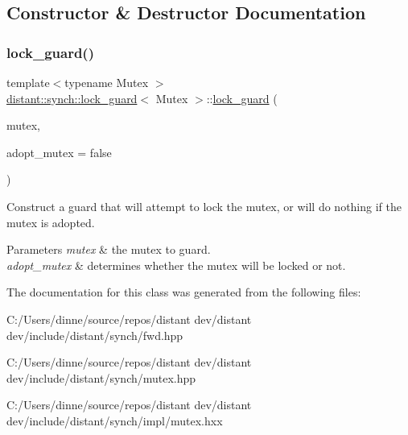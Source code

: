 \subsection{Constructor \& Destructor Documentation}
\mbox{\label{classdistant_1_1synch_1_1lock__guard_afe37b69ebfc05c1c97eb474cfdf9b4f1}} 
\subsubsection{\texorpdfstring{lock\+\_\+guard()}{lock\_guard()}}
{\footnotesize\ttfamily template$<$typename Mutex $>$ \\
\mbox{\hyperlink{classdistant_1_1synch_1_1lock__guard}{distant\+::synch\+::lock\+\_\+guard}}$<$ Mutex $>$\+::\mbox{\hyperlink{classdistant_1_1synch_1_1lock__guard}{lock\+\_\+guard}} (\begin{DoxyParamCaption}\item[{Mutex \&}]{mutex,  }\item[{bool}]{adopt\+\_\+mutex = {\ttfamily false} }\end{DoxyParamCaption})}



Construct a guard that will attempt to lock the mutex, or will do nothing if the mutex is adopted. 


\begin{DoxyParams}{Parameters}
{\em mutex} & the mutex to guard. \\
\hline
{\em adopt\+\_\+mutex} & determines whether the mutex will be locked or not. \\
\hline
\end{DoxyParams}


The documentation for this class was generated from the following files\+:\begin{DoxyCompactItemize}
\item 
C\+:/\+Users/dinne/source/repos/distant dev/distant dev/include/distant/synch/fwd.\+hpp\item 
C\+:/\+Users/dinne/source/repos/distant dev/distant dev/include/distant/synch/mutex.\+hpp\item 
C\+:/\+Users/dinne/source/repos/distant dev/distant dev/include/distant/synch/impl/mutex.\+hxx\end{DoxyCompactItemize}
